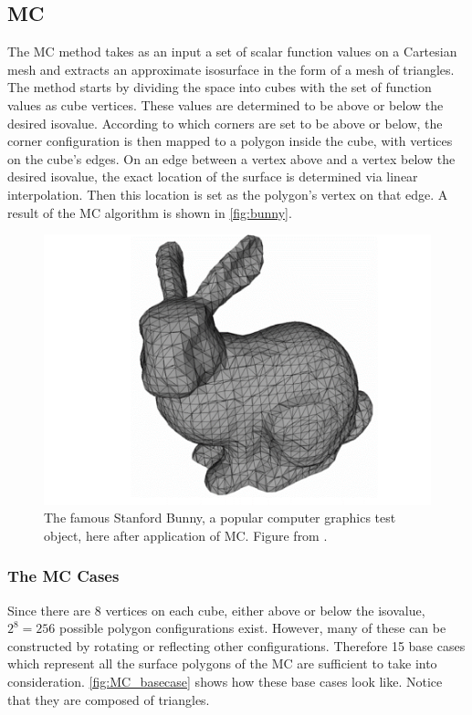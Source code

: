 \subsection{\Acl{MC}} 
The \acf{MC} method \cite{Marching2006} takes as an input a set of scalar function values on a Cartesian mesh and extracts an approximate isosurface in the form of a mesh of triangles. The method starts by dividing the space into cubes with the set of function values as cube vertices. These values are determined to be above or below the desired isovalue. According to which corners are set to be above or below, the corner configuration is then mapped to a polygon inside the cube, with vertices on the cube's edges. On an edge between a vertex above and a vertex below the desired isovalue, the exact location of the surface is determined via linear interpolation. Then this location is set as the polygon's vertex on that edge. A result of the \ac{MC} algorithm is shown in \autoref{fig:bunny}.

\begin{figure}[b]
\centering
   \includegraphics[width=.4\textwidth]{Pictures/SurfaceReconstruction/new_bunny.png}
   \caption{The famous Stanford Bunny, a popular computer graphics test object, here after application of \ac{MC}. Figure from \cite{NielsonParametrization}. }
   \label{fig:bunny}
\end{figure}


\subsubsection{The \acl{MC} Cases}
Since there are 8 vertices on each cube, either above or below the isovalue, $2^8=256$ possible polygon configurations exist. However, many of these can be constructed by rotating or reflecting other configurations. Therefore 15 base cases which represent all the surface polygons of the \acl{MC} are sufficient to take into consideration. \autoref{fig:MC_basecase} shows how these base cases look like. Notice that they are composed of triangles. 

